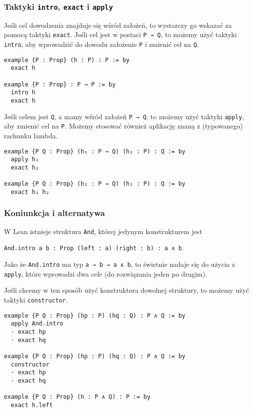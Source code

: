 \documentclass[polish,pretty]{angav}
\newcommand{\Lean}[1]{\texttt{#1}}
\newcommand{\centerLean}[2][]{\begin{center}\Lean{#2}#1\end{center}}
\begin{document}
\subsubsection*{Taktyki \texttt{intro}, \texttt{exact} i \texttt{apply}}

Jeśli cel dowodzenia znajduje się wśród założeń, to wystarczy go wskazać za pomocą taktyki \Lean{exact}. Jeśli cel jest w postaci \Lean{P → Q}, to możemy użyć taktyki \Lean{intro}, aby wprowadzić do dowodu założenie \Lean{P} i zmienić cel na \Lean{Q}.
\begin{verbatim}
example {P : Prop} (h : P) : P := by
  exact h

example {P : Prop} : P → P := by
  intro h
  exact h
\end{verbatim}

Jeśli celem jest \Lean{Q}, a mamy wśród założeń \Lean{P → Q}, to możemy użyć taktyki \Lean{apply}, aby zmienić cel na \Lean{P}. Możemy stosować również aplikację znaną z (typowanego) rachunku lambda.
\begin{verbatim}
example {P Q : Prop} (h₁ : P → Q) (h₂ : P) : Q := by
  apply h₁
  exact h₂

example {P Q : Prop} (h₁ : P → Q) (h₂ : P) : Q := by
  exact h₁ h₂
\end{verbatim}

\subsubsection*{Koniunkcja i alternatywa}

W Lean istnieje struktura \Lean{And}, której jedynym konstrukturem jest
\centerLean[.]{And.intro {a b : Prop} (left : a) (right : b) : a ∧ b}
Jako że \Lean{And.intro} ma typ \Lean{a → b → a ∧ b}, to świetnie nadaje się do użycia z \Lean{apply}, które wprowadzi dwa cele (do rozwiązania jeden po drugim).

Jeśli chcemy w ten sposób użyć konstruktora dowolnej struktury, to możemy użyć taktyki \Lean{constructor}.

\begin{verbatim}
example {P Q : Prop} (hp : P) (hq : Q) : P ∧ Q := by
  apply And.intro
  · exact hp
  · exact hq

example {P Q : Prop} (hp : P) (hq : Q) : P ∧ Q := by
  constructor
  · exact hp
  · exact hq

example {P Q : Prop} (h : P ∧ Q) : P := by
  exact h.left
\end{verbatim}
\end{document}
